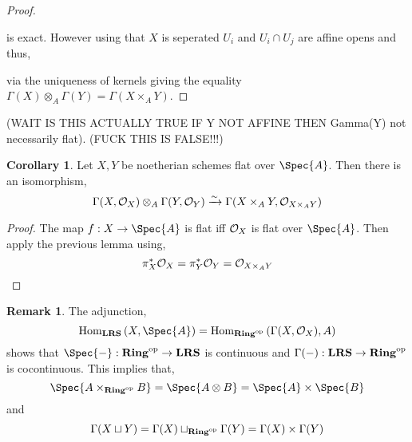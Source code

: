 \documentclass[12pt]{extarticle}
\newcommand{\Hom}[3]{\mathrm{Hom}_{#1}\left( #2, #3 \right)}
\theoremstyle{definition}
\newtheorem{corollary}[theorem]{Corollary}
\newtheorem{remark}{Remark}
\begin{document}
\begin{proof}
\begin{center}
\end{center}
is exact. However using that $X$ is seperated $U_i$ and $U_i \cap U_j$ are affine opens and thus, 
\begin{center}
\end{center}
via the uniqueness of kernels giving the equality $\Gamma(X) \otimes_A \Gamma(Y) = \Gamma(X \times_A Y)$. 
\end{proof}

(WAIT IS THIS ACTUALLY TRUE IF Y NOT AFFINE THEN Gamma(Y) not necessarily flat). 
(FUCK THIS IS FALSE!!!)

\begin{corollary}
Let $X, Y$ be noetherian schemes flat over $\Spec{A}$. Then there is an isomorphism,
\[ \Gamma(X, \mathcal{O}_{X}) \otimes_A \Gamma(Y, \mathcal{O}_{Y}) \xrightarrow{\sim} \Gamma(X \times_A Y, \mathcal{O}_{X \times_A Y}) \]
\end{corollary}

\begin{proof}
The map $f : X \to \Spec{A}$ is flat iff $\mathcal{O}_{X}$ is flat over $\Spec{A}$. Then apply the previous lemma using,
\[ \pi_X^* \mathcal{O}_{X} = \pi_Y^* \mathcal{O}_{Y} = \mathcal{O}_{X \times_A Y} \]
\end{proof}

\newcommand{\Ring}{\mathbf{Ring}}

\begin{remark}
The adjunction,
\[ \Hom{\mathbf{LRS}}{X}{\Spec{A}} = \Hom{\Ring^{\op}}{\Gamma(X, \struct{X})}{A} \]
shows that $\Spec{-} : \Ring^\op \to \mathbf{LRS}$ is continuous and $\Gamma(-) : \mathbf{LRS} \to \Ring^\op$ is cocontinuous. This implies that,
\[ \Spec{A \times_{\Ring^\op} B} = \Spec{A \otimes B} = \Spec{A} \times \Spec{B} \]
and
\[ \Gamma(X \sqcup Y) = \Gamma(X) \sqcup_{\Ring^\op} \Gamma(Y) = \Gamma(X) \times \Gamma(Y) \]
\end{remark}
\end{document}
